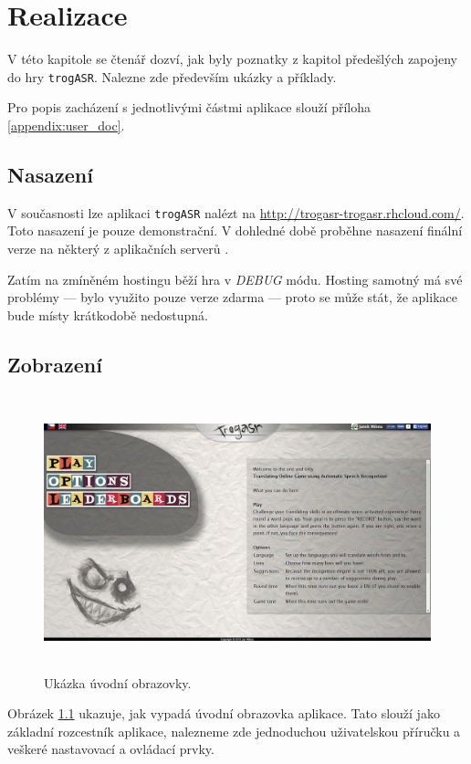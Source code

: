 \chapter{Realizace}

V této kapitole se čtenář dozví, jak byly poznatky z kapitol předešlých zapojeny do hry \verb|trogASR|. Nalezne zde především ukázky a příklady.

Pro popis zacházení s jednotlivými částmi aplikace slouží příloha \ref{appendix:user_doc}.

\section{Nasazení}

V současnosti lze aplikaci \verb|trogASR| nalézt na \url{http://trogasr-trogasr.rhcloud.com/}. Toto nasazení je pouze demonstrační. V dohledné době proběhne nasazení finální verze na některý z aplikačních serverů .

Zatím na zmíněném hostingu běží hra v {\sl DEBUG} módu. Hosting samotný má své problémy --- bylo využito pouze verze zdarma --- proto se může stát, že aplikace bude místy krátkodobě nedostupná.

\section{Zobrazení}

\begin{figure}[h]
	\centering
	\includegraphics[width=140mm,height=80mm]{img/title_screen.jpg}
	\caption{Ukázka úvodní obrazovky.}
	\label{fig:title}
\end{figure}

Obrázek \ref{fig:title} ukazuje, jak vypadá úvodní obrazovka aplikace. Tato slouží jako základní rozcestník aplikace, nalezneme zde jednoduchou uživatelskou příručku a veškeré nastavovací a ovládací prvky.

